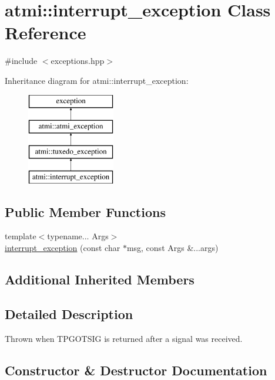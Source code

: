 \hypertarget{classatmi_1_1interrupt__exception}{}\section{atmi\+:\+:interrupt\+\_\+exception Class Reference}
\label{classatmi_1_1interrupt__exception}


{\ttfamily \#include $<$exceptions.\+hpp$>$}

Inheritance diagram for atmi\+:\+:interrupt\+\_\+exception\+:\begin{figure}[H]
\begin{center}
\leavevmode
\includegraphics[height=4.000000cm]{classatmi_1_1interrupt__exception}
\end{center}
\end{figure}
\subsection*{Public Member Functions}
\begin{DoxyCompactItemize}
\item 
{\footnotesize template$<$typename... Args$>$ }\\\hyperlink{classatmi_1_1interrupt__exception_afe1b916f68a10fe0627f396052d45c9f}{interrupt\+\_\+exception} (const char $\ast$msg, const Args \&...args)
\end{DoxyCompactItemize}
\subsection*{Additional Inherited Members}


\subsection{Detailed Description}
Thrown when T\+P\+G\+O\+T\+S\+I\+G is returned after a signal was received. 

\subsection{Constructor \& Destructor Documentation}
\hypertarget{classatmi_1_1interrupt__exception_afe1b916f68a10fe0627f396052d45c9f}{}
